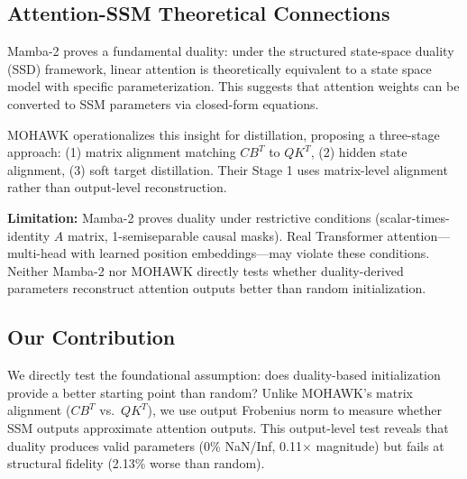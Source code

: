 \subsection{Attention-SSM Theoretical Connections}

Mamba-2 \cite{dao2024mamba2} proves a fundamental duality: under the structured state-space duality (SSD) framework, linear attention is theoretically equivalent to a state space model with specific parameterization. This suggests that attention weights can be converted to SSM parameters via closed-form equations.

MOHAWK \cite{waleffe2024mohawk} operationalizes this insight for distillation, proposing a three-stage approach: (1) matrix alignment matching $CB^T$ to $QK^T$, (2) hidden state alignment, (3) soft target distillation. Their Stage 1 uses matrix-level alignment rather than output-level reconstruction.

\textbf{Limitation:} Mamba-2 proves duality under restrictive conditions (scalar-times-identity $A$ matrix, 1-semiseparable causal masks). Real Transformer attention---multi-head with learned position embeddings---may violate these conditions. Neither Mamba-2 nor MOHAWK directly tests whether duality-derived parameters reconstruct attention outputs better than random initialization.

\subsection{Our Contribution}

We directly test the foundational assumption: does duality-based initialization provide a better starting point than random? Unlike MOHAWK's matrix alignment ($CB^T$ vs.\ $QK^T$), we use output Frobenius norm to measure whether SSM outputs approximate attention outputs. This output-level test reveals that duality produces valid parameters (0\% NaN/Inf, 0.11$\times$ magnitude) but fails at structural fidelity (2.13\% worse than random).
